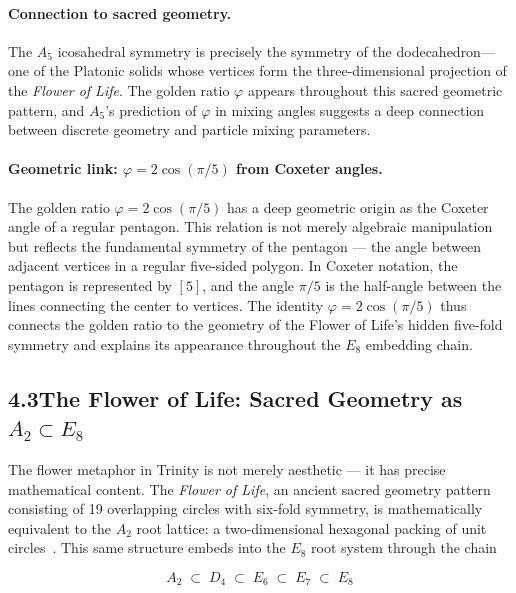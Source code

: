 \documentclass[10pt,a4paper]{article}
\begin{document}
\paragraph{Connection to sacred geometry.} The $A_5$ icosahedral symmetry
is precisely the symmetry of the dodecahedron---one of the Platonic solids whose
vertices form the three-dimensional projection of the \textit{Flower of Life}. The golden
ratio $\varphi$ appears throughout this sacred geometric pattern, and $A_5$'s prediction
of $\varphi$ in mixing angles suggests a deep connection between discrete geometry and
particle mixing parameters.

\paragraph{Geometric link: $\varphi = 2\cos(\pi/5)$ from Coxeter angles.}
The golden ratio $\varphi = 2\cos(\pi/5)$ has a deep geometric origin as the Coxeter angle
of a regular pentagon. This relation is not merely algebraic manipulation but reflects the
fundamental symmetry of the pentagon --- the angle between adjacent vertices in a regular
five-sided polygon. In Coxeter notation, the pentagon is represented by $[5]$, and the angle
$\pi/5$ is the half-angle between the lines connecting the center to vertices. The identity $\varphi = 2\cos(\pi/5)$ thus connects the golden ratio to the geometry of the Flower of Life's hidden five-fold symmetry and explains its appearance throughout the $E_8$ embedding chain.

\subsection*{4.3\quad The Flower of Life: Sacred Geometry as $A_2 \subset E_8$}

The flower metaphor in Trinity is not merely aesthetic --- it has precise mathematical content. The \emph{Flower of Life}, an ancient sacred geometry pattern consisting of 19 overlapping circles with six-fold symmetry, is mathematically equivalent to the $A_2$ root lattice: a two-dimensional hexagonal packing of unit circles~\cite{conway1999}. This same structure embeds into the $E_8$ root system through the chain

\begin{equation}
  A_2 \;\subset\; D_4 \;\subset\; E_6 \;\subset\; E_7 \;\subset\; E_8
  \label{eq:embedding_chain}
\end{equation}
\end{document}
